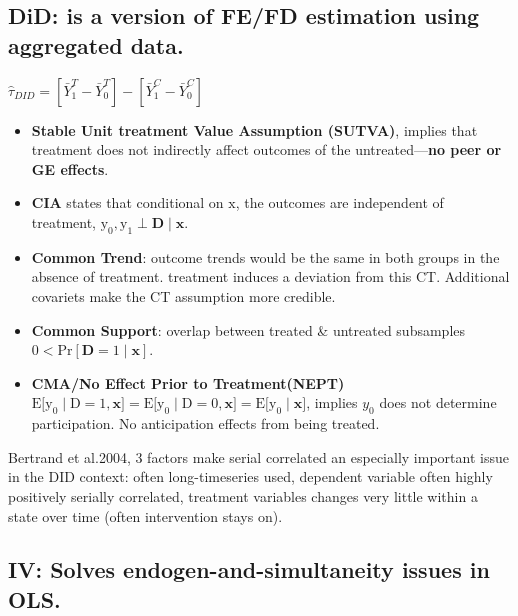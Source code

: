 \documentclass[
]{article}
\providecommand{\tightlist}{%
  \setlength{\itemsep}{0pt}\setlength{\parskip}{0pt}}
\begin{document}
\hypertarget{did-is-a-version-of-fefd-estimation-using-aggregated-data.}{%
\subsection{DiD: is a version of FE/FD estimation using aggregated
data.}\label{did-is-a-version-of-fefd-estimation-using-aggregated-data.}}

\(\hat{\tau}_{D I D}=\left[\bar{Y}_{1}^{T}-\bar{Y}_{0}^{T}\right]-\left[\bar{Y}_{1}^{C}-\bar{Y}_{0}^{C}\right]\)

\begin{itemize}
\tightlist
\item
  \textbf{Stable Unit treatment Value Assumption (SUTVA)}, implies that
  treatment does not indirectly affect outcomes of the
  untreated---\textbf{no peer or GE effects}.\\
\item
  \textbf{CIA} states that conditional on \(\mathrm{x}\), the outcomes
  are independent of treatment,
  \(\mathrm{y_0, y_1 \perp \mathbf{D}\mid \mathbf{x}}.\)\\
\item
  \textbf{Common Trend}: outcome trends would be the same in both groups
  in the absence of treatment. treatment induces a deviation from this
  CT. Additional covariets make the CT assumption more credible.\\
\item
  \textbf{Common Support}: overlap between treated \& untreated
  subsamples \(\mathrm{0<Pr[\mathbf{D}=1\mid \mathbf{x}]}\).\\
\item
  \textbf{CMA/No Effect Prior to Treatment(NEPT)}
  \(\mathrm{E\bigl[y_0\mid D=1,\mathbf{x}\bigr]=E\bigl[y_0\mid D=0,\mathbf{x}\bigr]=E\bigl[y_0\mid\mathbf{x}\bigr]}\),
  implies \(y_0\) does not determine participation. No anticipation
  effects from being treated.
\end{itemize}

Bertrand et al.2004, 3 factors make serial correlated an especially
important issue in the DID context: often long-timeseries used,
dependent variable often highly positively serially correlated,
treatment variables changes very little within a state over time (often
intervention stays on).

\hypertarget{iv-solves-endogen-and-simultaneity-issues-in-ols.}{%
\subsection{\texorpdfstring{\textbf{IV}: Solves endogen-and-simultaneity
issues in
OLS.}{IV: Solves endogen-and-simultaneity issues in OLS.}}\label{iv-solves-endogen-and-simultaneity-issues-in-ols.}}
\end{document}
